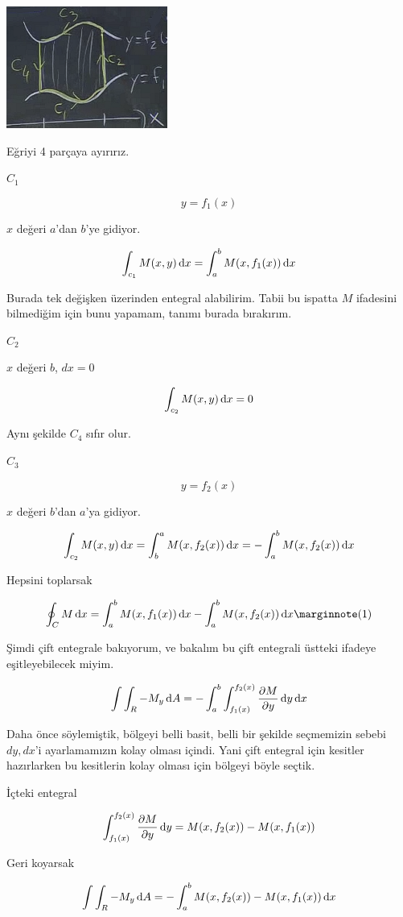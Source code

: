 \documentclass[12pt,fleqn]{article}\usepackage{../../common}
\begin{document}
\includegraphics[height=4cm]{22_8.png}

Eğriyi 4 parçaya ayırırız. 

$C_1$

$$ y = f_1(x) $$

$x$ değeri $a$'dan $b$'ye gidiyor. 

$$ \int_{c_1}M(x,y) \,\mathrm{d} x = \int_a^b M(x,f_1(x)) \,\mathrm{d} x$$

Burada tek değişken üzerinden entegral alabilirim. Tabii bu ispatta $M$
ifadesini bilmediğim için bunu yapamam, tanımı burada bırakırım. 

$C_2$

$x$ değeri $b$, $dx = 0$

$$ \int_{c_2}M(x,y) \,\mathrm{d} x = 0$$

Aynı şekilde $C_4$ sıfır olur. 

$C_3$

$$ y = f_2(x) $$

$x$ değeri $b$'dan $a$'ya gidiyor. 

$$
\int_{c_2}M(x,y) \,\mathrm{d} x = \int_b^a M(x,f_2(x)) \,\mathrm{d} x = - \int_a^b M(x,f_2(x)) \,\mathrm{d} 
x 
$$

Hepsini toplarsak

$$
\oint_C M \ud x  =
\int_a^b M(x,f_1(x)) \ud x - \int_a^b M(x,f_2(x)) \ud x 
\mlabel{1}
$$

Şimdi çift entegrale bakıyorum, ve bakalım bu çift entegrali üstteki
ifadeye eşitleyebilecek miyim. 

$$
\int \int_R -M_y \,\mathrm{d} A
= - \int_a^b \int_{f_1(x)}^{f_2(x)} \frac{\partial M}{\partial y} \,\mathrm{d} y \,\mathrm{d} x
$$

Daha önce söylemiştik, bölgeyi belli basit, belli bir şekilde seçmemizin
sebebi $dy,dx$'i ayarlamamızın kolay olması içindi. Yani çift entegral için
kesitler hazırlarken bu kesitlerin kolay olması için bölgeyi böyle
seçtik. 

İçteki entegral

$$ \int_{f_1(x)}^{f_2(x)} \frac{\partial M}{\partial y} \,\mathrm{d} y =
M(x,f_2(x)) - M(x,f_1(x))
 $$

Geri koyarsak

$$
\int \int_R -M_y \,\mathrm{d} A
= - \int_a^b M(x,f_2(x)) - M(x,f_1(x)) \,\mathrm{d} x
$$
\end{document}
